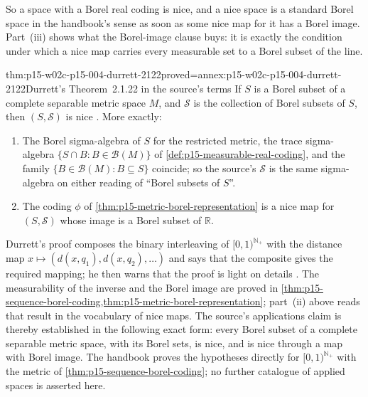 So a space with a Borel real coding is nice, and a nice space is a
standard Borel space in the handbook's sense as soon as some nice map
for it has a Borel image. Part~(iii) shows what the Borel-image clause
buys: it is exactly the condition under which a nice map carries every
measurable set to a Borel subset of the line.

\begin{hbtheorem}{thm:p15-w02c-p15-004-durrett-2122}{proved=annex:p15-w02c-p15-004-durrett-2122}{Durrett's Theorem~2.1.22 in the source's terms}
If \(S\) is a Borel subset of a complete separable metric space \(M\),
and \(\mathcal S\) is the collection of Borel subsets of \(S\), then
\((S,\mathcal S)\) is nice \cite[Theorem~2.1.22, p.~54]{DurrettPTEAuthor2019}.
More exactly:
\begin{enumerate}
\item The Borel sigma-algebra of \(S\) for the restricted metric, the
      trace sigma-algebra \(\{S\cap B:B\in\mathcal B(M)\}\) of
      \cref{def:p15-measurable-real-coding}, and the family
      \(\{B\in\mathcal B(M):B\subseteq S\}\) coincide; so the source's
      \(\mathcal S\) is the same sigma-algebra on either reading of
      ``Borel subsets of \(S\)''.
\item The coding \(\phi\) of \cref{thm:p15-metric-borel-representation}
      is a nice map for \((S,\mathcal S)\) whose image is a Borel subset
      of \(\mathbb R\).
\end{enumerate}
\end{hbtheorem}

Durrett's proof composes the binary interleaving of \([0,1)^{\mathbb N_+}\)
with the distance map \(x\mapsto(d(x,q_1),d(x,q_2),\ldots)\) and says that
the composite gives the required mapping; he then warns that the proof is
light on details \cite[p.~54]{DurrettPTEAuthor2019}. The measurability of
the inverse and the Borel image are proved in
\cref{thm:p15-sequence-borel-coding,thm:p15-metric-borel-representation};
part~(ii) above reads that result in the vocabulary of nice maps.
The source's applications claim is thereby established in the following
exact form: every Borel subset of a complete separable metric space, with
its Borel sets, is nice, and is nice through a map with Borel image. The
handbook proves the hypotheses directly for \([0,1)^{\mathbb N_+}\) with the
metric of \cref{thm:p15-sequence-borel-coding}; no further catalogue of
applied spaces is asserted here.


